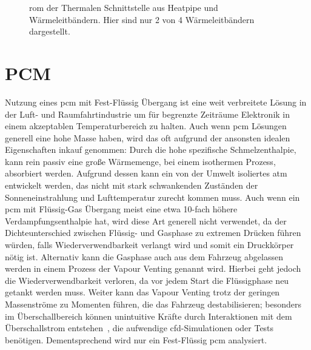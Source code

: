 \begin{figure}[H]
  \caption{\ac{rom} der Thermalen Schnittstelle aus Heatpipe und Wärmeleitbändern. Hier sind nur 2 von 4 Wärmeleitbändern dargestellt.}\label{fig:thermale_schnittstelle}
\end{figure}

\section{PCM}

Nutzung eines \ac{pcm} mit Fest-Flüssig Übergang ist eine weit verbreitete Lösung in der Luft- und Raumfahrtindustrie um für begrenzte Zeiträume Elektronik in einem akzeptablen
Temperaturbereich zu halten. Auch wenn \ac{pcm} Lösungen generell eine hohe Masse haben, wird das oft aufgrund der ansonsten idealen Eigenschaften inkauf genommen:
Durch die hohe spezifische Schmelzenthalpie, kann rein passiv eine große Wärmemenge, bei einem isothermen Prozess, absorbiert werden. Aufgrund dessen
kann ein von der Umwelt isoliertes \ac{atm} entwickelt werden, das nicht mit stark schwankenden Zuständen der Sonneneinstrahlung und Lufttemperatur
zurecht kommen muss. Auch wenn ein \ac{pcm} mit Flüssig-Gas Übergang meist eine etwa 10-fach höhere Verdampfungsenthalpie hat, wird diese Art
generell nicht verwendet, da der Dichteunterschied zwischen Flüssig- und Gasphase zu extremen Drücken führen würden, falls Wiederverwendbarkeit
verlangt wird und somit ein Druckkörper nötig ist. Alternativ kann die Gasphase auch aus dem Fahrzeug abgelassen werden in einem Prozess der
Vapour Venting genannt wird. Hierbei geht jedoch die Wiederverwendbarkeit verloren, da vor jedem Start die Flüssigphase neu getankt werden muss.
Weiter kann das Vapour Venting trotz der geringen Massenströme zu Momenten führen, die das Fahrzeug destabilisieren; besonders im Überschallbereich
können unintuitive Kräfte durch Interaktionen mit dem Überschallstrom entstehen~\cite{Deere-2011}, die aufwendige \ac{cfd}-Simulationen oder Tests benötigen.
Dementsprechend wird nur ein Fest-Flüssig \ac{pcm} analysiert.

